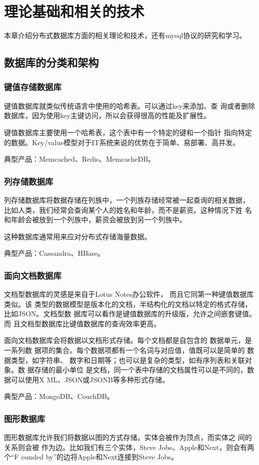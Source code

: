 
\chapter{理论基础和相关的技术}
本章介绍分布式数据库方面的相关理论和技术，还有mysql协议的研究和学习。
\section{数据库的分类和架构}
\subsection{键值存储数据库}
键值数据库就类似传统语言中使用的哈希表。可以通过key来添加、查
询或者删除数据库，因为使用key主键访问，所以会获得很高的性能及扩展性。

键值数据库主要使用一个哈希表，这个表中有一个特定的键和一个指针
指向特定的数据。Key/value模型对于IT系统来说的优势在于简单、易部署、高并发。

典型产品：Memcached、Redis、MemcacheDB。
\subsection{列存储数据库}
列存储数据库将数据存储在列族中，一个列族存储经常被一起查询的相关数据，
比如人类，我们经常会查询某个人的姓名和年龄，而不是薪资。这种情况下姓
名和年龄会被放到一个列族中，薪资会被放到另一个列族中。

这种数据库通常用来应对分布式存储海量数据。

典型产品：Cassandra、HBase。
\subsection{面向文档数据库}
文档型数据库的灵感是来自于Lotus Notes办公软件，
而且它同第一种键值数据库类似。该
类型的数据模型是版本化的文档，半结构化的文档以特定的格式存储，比如JSON。文档型数
据库可以看作是键值数据库的升级版，允许之间嵌套键值。而
且文档型数据库比键值数据库的查询效率更高。

面向文档数据库会将数据以文档形式存储。每个文档都是自包含的
数据单元，是一系列数
据项的集合。每个数据项都有一个名词与对应值，值既可以是简单的
数据类型，如字符串、
数字和日期等；也可以是复杂的类型，如有序列表和关联对象。数
据存储的最小单位
是文档，同一个表中存储的文档属性可以是不同的，数据可以使用X
ML、JSON或JSONB等多种形式存储。

典型产品：MongoDB、CouchDB。
\subsection{图形数据库}
图形数据库允许我们将数据以图的方式存储。实体会被作为顶点，而实体之
间的关系则会被
作为边。比如我们有三个实体，Steve Jobs、Apple和Next，则会有两个“F
ounded by”的边将Apple和Next连接到Steve Jobs。

